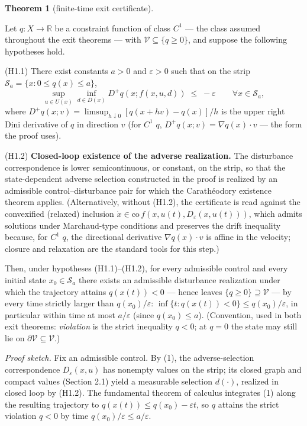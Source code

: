 \documentclass[10pt,twocolumn]{article}
\theoremstyle{definition}
\newtheorem{theorem}{Theorem}
\begin{document}
\begin{theorem}[finite-time exit certificate]\label{thm:exit}

Let \(q : X \to \mathbb{R}\) be a constraint function of class \(C^1\) --- the class assumed throughout the exit theorems --- with
\(\mathcal{V} \subseteq \{ q \ge 0 \}\), and suppose the following
hypotheses hold.

(H1.1) There exist constants \(a > 0\) and \(\varepsilon > 0\) such that
on the strip \(\mathcal{S}_a = \{ x : 0 \le q(x) \le a \}\),
\[\sup_{u \in U(x)} \inf_{d \in D(x)} D^+ q(x; f(x,u,d)) \;\le\; -\varepsilon \qquad \forall x \in \mathcal{S}_a, \tag{1}\]
where \(D^+ q(x; v) = \limsup_{h \downarrow 0} [q(x + hv) - q(x)]/h\) is
the upper right Dini derivative of \(q\) in direction \(v\) (for \(C^1\)
\(q\), \(D^+ q(x; v) = \nabla q(x) \cdot v\) --- the form the proof
uses).

(H1.2) \textbf{Closed-loop existence of the adverse realization.} The
disturbance correspondence is lower semicontinuous, or constant, on the
strip, so that the state-dependent adverse selection constructed in the
proof is realized by an admissible control--disturbance pair for which
the Carath\'eodory existence theorem applies. (Alternatively, without (H1.2), the certificate is read against the convexified (relaxed) inclusion
\(\dot x \in \mathrm{co}\, f(x, u(t), D_{\varepsilon}(x, u(t)))\), which
admits solutions under Marchaud-type conditions and preserves the drift
inequality because, for \(C^1\) \(q\), the directional derivative
\(\nabla q(x)\cdot v\) is affine in the velocity; closure and
relaxation are the standard tools for this step.)

Then, under hypotheses (H1.1)--(H1.2), for every
admissible control and every initial state \(x_0 \in \mathcal{S}_a\)
there exists an admissible disturbance realization under which the
trajectory attains \(q(x(t)) < 0\) --- hence leaves
\(\{ q \ge 0 \} \supseteq \mathcal{V}\) --- by every time strictly
larger than \(q(x_0)/\varepsilon\):
\(\inf\{ t : q(x(t)) < 0 \} \le q(x_0)/\varepsilon\), in particular
within time at most \(a/\varepsilon\) (since \(q(x_0) \le a\)).
(Convention, used in both exit theorems: \emph{violation} is the strict
inequality \(q < 0\); at \(q = 0\) the state may still lie on
\(\partial \mathcal{V} \subseteq \mathcal{V}\).)

\end{theorem}

\emph{Proof sketch.} Fix an admissible control. By (1), the adverse-selection correspondence \(D_\varepsilon(x,u)\) has nonempty values on the strip; its closed graph and compact values (Section 2.1) yield a measurable selection \(d(\cdot)\), realized in closed loop by (H1.2). The fundamental theorem of calculus integrates (1) along the resulting trajectory to \(q(x(t)) \le q(x_0) - \varepsilon t\), so \(q\) attains the strict violation \(q < 0\) by time \(q(x_0)/\varepsilon \le a/\varepsilon\).
\end{document}
